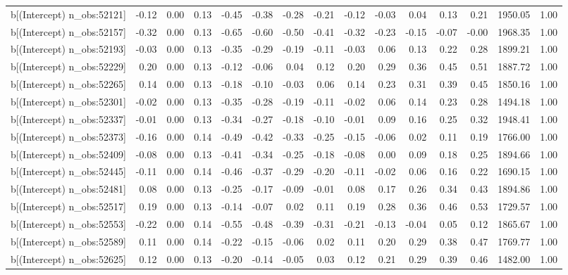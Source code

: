 \begin{table}[ht]
\begin{tabular}{rrrrrrrrrrrrrrr}
  b[(Intercept) n\_obs:52121] & -0.12 & 0.00 & 0.13 & -0.45 & -0.38 & -0.28 & -0.21 & -0.12 & -0.03 & 0.04 & 0.13 & 0.21 & 1950.05 & 1.00 \\ 
  b[(Intercept) n\_obs:52157] & -0.32 & 0.00 & 0.13 & -0.65 & -0.60 & -0.50 & -0.41 & -0.32 & -0.23 & -0.15 & -0.07 & -0.00 & 1968.35 & 1.00 \\ 
  b[(Intercept) n\_obs:52193] & -0.03 & 0.00 & 0.13 & -0.35 & -0.29 & -0.19 & -0.11 & -0.03 & 0.06 & 0.13 & 0.22 & 0.28 & 1899.21 & 1.00 \\ 
  b[(Intercept) n\_obs:52229] & 0.20 & 0.00 & 0.13 & -0.12 & -0.06 & 0.04 & 0.12 & 0.20 & 0.29 & 0.36 & 0.45 & 0.51 & 1887.72 & 1.00 \\ 
  b[(Intercept) n\_obs:52265] & 0.14 & 0.00 & 0.13 & -0.18 & -0.10 & -0.03 & 0.06 & 0.14 & 0.23 & 0.31 & 0.39 & 0.45 & 1850.16 & 1.00 \\ 
  b[(Intercept) n\_obs:52301] & -0.02 & 0.00 & 0.13 & -0.35 & -0.28 & -0.19 & -0.11 & -0.02 & 0.06 & 0.14 & 0.23 & 0.28 & 1494.18 & 1.00 \\ 
  b[(Intercept) n\_obs:52337] & -0.01 & 0.00 & 0.13 & -0.34 & -0.27 & -0.18 & -0.10 & -0.01 & 0.09 & 0.16 & 0.25 & 0.32 & 1948.41 & 1.00 \\ 
  b[(Intercept) n\_obs:52373] & -0.16 & 0.00 & 0.14 & -0.49 & -0.42 & -0.33 & -0.25 & -0.15 & -0.06 & 0.02 & 0.11 & 0.19 & 1766.00 & 1.00 \\ 
  b[(Intercept) n\_obs:52409] & -0.08 & 0.00 & 0.13 & -0.41 & -0.34 & -0.25 & -0.18 & -0.08 & 0.00 & 0.09 & 0.18 & 0.25 & 1894.66 & 1.00 \\ 
  b[(Intercept) n\_obs:52445] & -0.11 & 0.00 & 0.14 & -0.46 & -0.37 & -0.29 & -0.20 & -0.11 & -0.02 & 0.06 & 0.16 & 0.22 & 1690.15 & 1.00 \\ 
  b[(Intercept) n\_obs:52481] & 0.08 & 0.00 & 0.13 & -0.25 & -0.17 & -0.09 & -0.01 & 0.08 & 0.17 & 0.26 & 0.34 & 0.43 & 1894.86 & 1.00 \\ 
  b[(Intercept) n\_obs:52517] & 0.19 & 0.00 & 0.13 & -0.14 & -0.07 & 0.02 & 0.11 & 0.19 & 0.28 & 0.36 & 0.46 & 0.53 & 1729.57 & 1.00 \\ 
  b[(Intercept) n\_obs:52553] & -0.22 & 0.00 & 0.14 & -0.55 & -0.48 & -0.39 & -0.31 & -0.21 & -0.13 & -0.04 & 0.05 & 0.12 & 1865.67 & 1.00 \\ 
  b[(Intercept) n\_obs:52589] & 0.11 & 0.00 & 0.14 & -0.22 & -0.15 & -0.06 & 0.02 & 0.11 & 0.20 & 0.29 & 0.38 & 0.47 & 1769.77 & 1.00 \\ 
  b[(Intercept) n\_obs:52625] & 0.12 & 0.00 & 0.13 & -0.20 & -0.14 & -0.05 & 0.03 & 0.12 & 0.21 & 0.29 & 0.39 & 0.46 & 1482.00 & 1.00 \\ 

\end{tabular}
\end{table}
